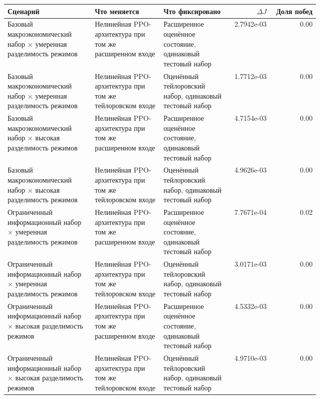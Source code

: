 \begin{tabular}{p{0.28\linewidth}p{0.22\linewidth}p{0.22\linewidth}rr}
\toprule
Сценарий & Что меняется & Что фиксировано & $\Delta J$ & Доля побед \\
\midrule
Базовый макроэкономический набор × умеренная разделимость режимов & Нелинейная PPO-архитектура при том же расширенном входе & Расширенное оценённое состояние, одинаковый тестовый набор & 2.7942e-03 & 0.00 \\
Базовый макроэкономический набор × умеренная разделимость режимов & Нелинейная PPO-архитектура при том же тейлоровском входе & Оценённый тейлоровский набор, одинаковый тестовый набор & 1.7712e-03 & 0.00 \\
Базовый макроэкономический набор × высокая разделимость режимов & Нелинейная PPO-архитектура при том же расширенном входе & Расширенное оценённое состояние, одинаковый тестовый набор & 4.7154e-03 & 0.00 \\
Базовый макроэкономический набор × высокая разделимость режимов & Нелинейная PPO-архитектура при том же тейлоровском входе & Оценённый тейлоровский набор, одинаковый тестовый набор & 4.9626e-03 & 0.00 \\
Ограниченный информационный набор × умеренная разделимость режимов & Нелинейная PPO-архитектура при том же расширенном входе & Расширенное оценённое состояние, одинаковый тестовый набор & 7.7671e-04 & 0.02 \\
Ограниченный информационный набор × умеренная разделимость режимов & Нелинейная PPO-архитектура при том же тейлоровском входе & Оценённый тейлоровский набор, одинаковый тестовый набор & 3.0171e-03 & 0.00 \\
Ограниченный информационный набор × высокая разделимость режимов & Нелинейная PPO-архитектура при том же расширенном входе & Расширенное оценённое состояние, одинаковый тестовый набор & 4.5332e-03 & 0.00 \\
Ограниченный информационный набор × высокая разделимость режимов & Нелинейная PPO-архитектура при том же тейлоровском входе & Оценённый тейлоровский набор, одинаковый тестовый набор & 4.9710e-03 & 0.00 \\
\bottomrule
\end{tabular}